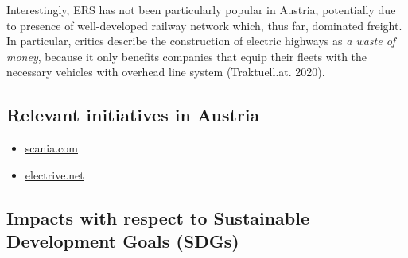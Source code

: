 \documentclass[
]{book}
\providecommand{\tightlist}{%
  \setlength{\itemsep}{0pt}\setlength{\parskip}{0pt}}
\begin{document}
Interestingly, ERS has not been particularly popular in Austria, potentially due to presence of well-developed railway network which, thus far, dominated freight. In particular, critics describe the construction of electric highways as \emph{a waste of money}, because it only benefits companies that equip their fleets with the necessary vehicles with overhead line system (Traktuell.at. 2020).

\hypertarget{relevant-initiatives-in-austria-2}{%
\subsection*{Relevant initiatives in Austria}\label{relevant-initiatives-in-austria-2}}

\begin{itemize}
\tightlist
\item
  \href{https://www.scania.com/at/de/home/products-and-services/trucks/sustainability/elektro-mobilitaet/oberleitungs-lkw.html}{scania.com}
\item
  \href{https://www.electrive.net/2019/07/24/auswertung-der-these-zu-lastkraftwagen-an-oberleitungen/}{electrive.net}
\end{itemize}

\hypertarget{impacts-with-respect-to-sustainable-development-goals-sdgs-2}{%
\subsection*{Impacts with respect to Sustainable Development Goals (SDGs)}\label{impacts-with-respect-to-sustainable-development-goals-sdgs-2}}
\end{document}
